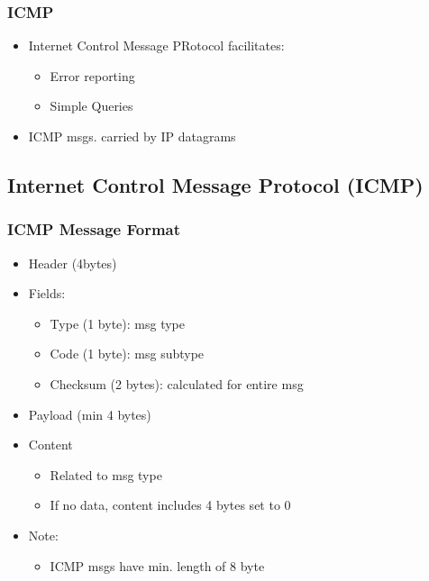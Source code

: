\documentclass[a4paper]{article}
\begin{document}
\subsubsection{ICMP}
\begin{itemize}
	\item Internet Control Message PRotocol facilitates:
	\begin{itemize}
		\item Error reporting
		\item Simple Queries
	\end{itemize}
	\item ICMP msgs. carried by IP datagrams
\end{itemize}
\subsection{Internet Control Message Protocol (ICMP)}
\subsubsection{ICMP Message Format}
\begin{itemize}
	\item Header (4bytes)
	\item Fields:
	\begin{itemize}
		\item Type (1 byte): msg type
		\item Code (1 byte): msg subtype
		\item Checksum (2 bytes): calculated for entire msg
	\end{itemize}
	\item Payload (min 4 bytes)
	\item Content
	\begin{itemize}
		\item Related to msg type
		\item If no data, content includes 4 bytes set to 0
	\end{itemize}
	\item Note:
	\begin{itemize}
		\item ICMP msgs have min. length of 8 byte
	\end{itemize}
\end{itemize}
\end{document}
